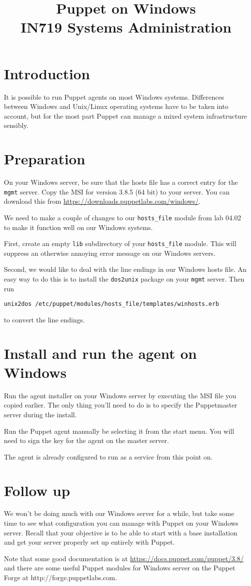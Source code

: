 \documentclass{article}   	%
\title{Puppet on Windows\\ IN719 Systems Administration}
\date{}							%
\begin{document}
\maketitle

\section*{Introduction}
It is possible to run Puppet agents on most Windows systems.  Differences between Windows and Unix/Linux operating systems have to be taken into account, but for the most part Puppet can manage a mixed system infrastructure sensibly.

\section{Preparation}
On your Windows server, be sure that the hosts file has a correct entry for the \texttt{mgmt} server.  Copy the MSI for version 3.8.5 (64 bit) to your server. You can download this from \url{https://downloads.puppetlabs.com/windows/}.

We need to make a couple of changes to our \texttt{hosts\_file} module from lab 04.02 to make it function well on our Windows systems.

First, create an empty \texttt{lib} subdirectory of your \texttt{hosts\_file} module.  This will suppress an otherwise annoying error message on our Windows servers.

Second, we would like to deal with the line endings in our Windows hosts file.  An easy way to do this is to install the \texttt{dos2unix} package on your \texttt{mgmt} server.  Then run

\texttt{unix2dos /etc/puppet/modules/hosts\_file/templates/winhosts.erb}

to convert the line endings.

\section{Install and run the agent on Windows}
Run the agent installer on your Windows server by executing the MSI file you copied earlier.  The only thing you'll need to do is to specify the Puppetmaster server during the install.

Run the Puppet agent manually be selecting it from the start menu. You will need to sign the key for the agent on the master server.

The agent is already configured to run as a service from this point on.

\section{Follow up}
We won't be doing much with our Windows server for a while, but take some time to see what configuration you can manage with Puppet on your Windows server.  Recall that your objective is to be able to start with a base installation and get your server properly set up entirely with Puppet.

Note that some good documentation is at \url{https://docs.puppet.com/puppet/3.8/} and there are some useful Puppet modules for Windows server on the Puppet Forge at http://forge.puppetlabs.com.
\end{document}
